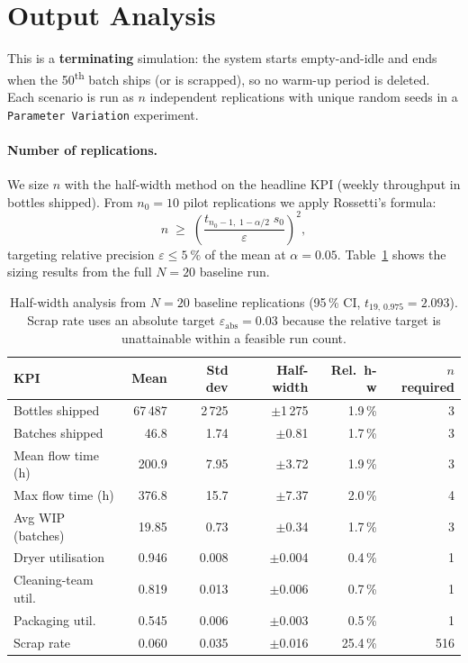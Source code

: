 \section{Output Analysis}
\label{sec:output}

This is a \textbf{terminating} simulation: the system starts empty-and-idle and
ends when the 50\textsuperscript{th} batch ships (or is scrapped), so no warm-up
period is deleted. Each scenario is run as $n$ independent replications with
unique random seeds in a \texttt{Parameter Variation} experiment.

\paragraph{Number of replications.}
We size $n$ with the half-width method on the headline KPI (weekly throughput in
bottles shipped). From $n_0 = 10$ pilot replications we apply Rossetti's formula:
\begin{equation}
  n \;\ge\; \left(\frac{t_{n_0-1,\;1-\alpha/2}\;s_0}{\varepsilon}\right)^{\!2},
  \label{eq:halfwidth}
\end{equation}
targeting relative precision $\varepsilon \le \SI{5}{\percent}$ of the mean at
$\alpha = 0.05$. Table~\ref{tab:reps} shows the sizing results from the
full $N=20$ baseline run.

\begin{table}[H]
\centering
\caption{Half-width analysis from $N=20$ baseline replications (95\,\% CI,
         $t_{19,\,0.975}=2.093$). Scrap rate uses an absolute target
         $\varepsilon_\text{abs}=0.03$ because the relative target is
         unattainable within a feasible run count.}
\label{tab:reps}
\small
\begin{tabularx}{\textwidth}{X r r r r r}
\toprule
KPI & Mean & Std dev & Half-width & Rel.\ h-w & $n$ required \\
\midrule
Bottles shipped       & 67\,487  & 2\,725   & $\pm$1\,275  & 1.9\,\%  & 3   \\
Batches shipped       & 46.8     & 1.74     & $\pm$0.81    & 1.7\,\%  & 3   \\
Mean flow time (h)    & 200.9    & 7.95     & $\pm$3.72    & 1.9\,\%  & 3   \\
Max flow time (h)     & 376.8    & 15.7     & $\pm$7.37    & 2.0\,\%  & 4   \\
Avg WIP (batches)     & 19.85    & 0.73     & $\pm$0.34    & 1.7\,\%  & 3   \\
Dryer utilisation     & 0.946    & 0.008    & $\pm$0.004   & 0.4\,\%  & 1   \\
Cleaning-team util.   & 0.819    & 0.013    & $\pm$0.006   & 0.7\,\%  & 1   \\
Packaging util.       & 0.545    & 0.006    & $\pm$0.003   & 0.5\,\%  & 1   \\
Scrap rate            & 0.060    & 0.035    & $\pm$0.016   & 25.4\,\% & 516 \\
\bottomrule
\end{tabularx}
\end{table}

